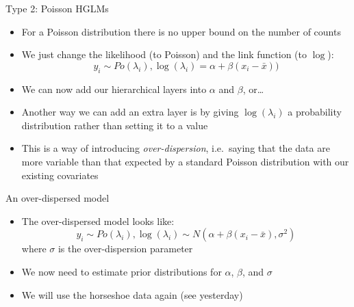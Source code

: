 \documentclass[ignorenonframetext,]{beamer}
\begin{document}
\begin{frame}{Type 2: Poisson HGLMs}

\begin{itemize}
\item
  For a Poisson distribution there is no upper bound on the number of
  counts
\item
  We just change the likelihood (to Poisson) and the link function (to
  \(\log\)):
  \[y_i \sim Po(\lambda_i), \log(\lambda_i) = \alpha + \beta (x_i - \bar{x}))\]
\item
  We can now add our hierarchical layers into \(\alpha\) and \(\beta\),
  or\ldots{}
\item
  Another way we can add an extra layer is by giving \(\log(\lambda_i)\)
  a probability distribution rather than setting it to a value
\item
  This is a way of introducing \emph{over-dispersion}, i.e.~saying that
  the data are more variable than that expected by a standard Poisson
  distribution with our existing covariates
\end{itemize}

\end{frame}

\begin{frame}{An over-dispersed model}

\begin{itemize}
\item
  The over-dispersed model looks like:
  \[y_i \sim Po(\lambda_i), \log(\lambda_i) \sim N(\alpha + \beta (x_i - \bar{x}), \sigma^2)\]
  where \(\sigma\) is the over-dispersion parameter
\item
  We now need to estimate prior distributions for \(\alpha\), \(\beta\),
  and \(\sigma\)
\item
  We will use the horseshoe data again (see yesterday)
\end{itemize}

\end{frame}
\end{document}

